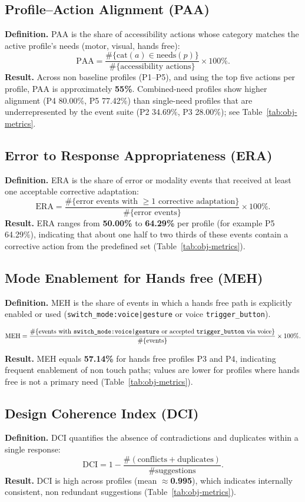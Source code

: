 \subsection{Profile–Action Alignment (PAA)}
\textbf{Definition.}
PAA is the share of accessibility actions whose category matches the active profile’s needs (motor, visual, hands free):
\[
\mathrm{PAA} = \frac{\#\{ \mathrm{cat}(a)\in \mathrm{needs}(p)\}}{\#\{\text{accessibility actions}\}} \times 100\%.
\]
\textbf{Result.}
Across non baseline profiles (P1–P5), and using the top five actions per profile, PAA is approximately \textbf{55\%}. Combined-need profiles show higher alignment (P4 80.00\%, P5 77.42\%) than single-need profiles that are underrepresented by the event suite (P2 34.69\%, P3 28.00\%); see Table~\ref{tab:obj-metrics}.

\subsection{Error to Response Appropriateness (ERA)}
\textbf{Definition.}
ERA is the share of error or modality events that received at least one acceptable corrective adaptation:
\[
\mathrm{ERA} = \frac{\#\{\text{error events with }\geq 1 \text{ corrective adaptation}\}}{\#\{\text{error events}\}} \times 100\%.
\]
\textbf{Result.}
ERA ranges from \textbf{50.00\%} to \textbf{64.29\%} per profile (for example P5 64.29\%), indicating that about one half to two thirds of these events contain a corrective action from the predefined set (Table~\ref{tab:obj-metrics}).

\subsection{Mode Enablement for Hands free (MEH)}
\textbf{Definition.}
MEH is the share of events in which a hands free path is explicitly enabled or used (\texttt{switch\_mode:voice|gesture} or voice \texttt{trigger\_button}).

\[
\mathrm{MEH} = \frac{\#\{\text{events with \texttt{switch\_mode:voice|gesture} or accepted \texttt{trigger\_button} via voice}\}}{\#\{\text{events}\}} \times 100\%.
\]

\textbf{Result.}
MEH equals \textbf{57.14\%} for hands free profiles P3 and P4, indicating frequent enablement of non touch paths; values are lower for profiles where hands free is not a primary need (Table~\ref{tab:obj-metrics}).

\subsection{Design Coherence Index (DCI)}
\textbf{Definition.}
DCI quantifies the absence of contradictions and duplicates within a single response:
\[
\mathrm{DCI} = 1 - \frac{\#(\text{conflicts}+\text{duplicates})}{\#\text{suggestions}}.
\]
\textbf{Result.}
DCI is high across profiles (mean $\approx$\textbf{0.995}), which indicates internally consistent, non redundant suggestions (Table~\ref{tab:obj-metrics}).

